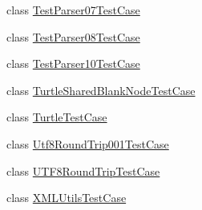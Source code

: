 \begin{DoxyCompactItemize}
\item 
class \hyperlink{classorg_1_1semanticweb_1_1owlapi_1_1api_1_1test_1_1syntax_1_1_test_parser07_test_case}{Test\-Parser07\-Test\-Case}
\item 
class \hyperlink{classorg_1_1semanticweb_1_1owlapi_1_1api_1_1test_1_1syntax_1_1_test_parser08_test_case}{Test\-Parser08\-Test\-Case}
\item 
class \hyperlink{classorg_1_1semanticweb_1_1owlapi_1_1api_1_1test_1_1syntax_1_1_test_parser10_test_case}{Test\-Parser10\-Test\-Case}
\item 
class \hyperlink{classorg_1_1semanticweb_1_1owlapi_1_1api_1_1test_1_1syntax_1_1_turtle_shared_blank_node_test_case}{Turtle\-Shared\-Blank\-Node\-Test\-Case}
\item 
class \hyperlink{classorg_1_1semanticweb_1_1owlapi_1_1api_1_1test_1_1syntax_1_1_turtle_test_case}{Turtle\-Test\-Case}
\item 
class \hyperlink{classorg_1_1semanticweb_1_1owlapi_1_1api_1_1test_1_1syntax_1_1_utf8_round_trip001_test_case}{Utf8\-Round\-Trip001\-Test\-Case}
\item 
class \hyperlink{classorg_1_1semanticweb_1_1owlapi_1_1api_1_1test_1_1syntax_1_1_u_t_f8_round_trip_test_case}{U\-T\-F8\-Round\-Trip\-Test\-Case}
\item 
class \hyperlink{classorg_1_1semanticweb_1_1owlapi_1_1api_1_1test_1_1syntax_1_1_x_m_l_utils_test_case}{X\-M\-L\-Utils\-Test\-Case}
\end{DoxyCompactItemize}
